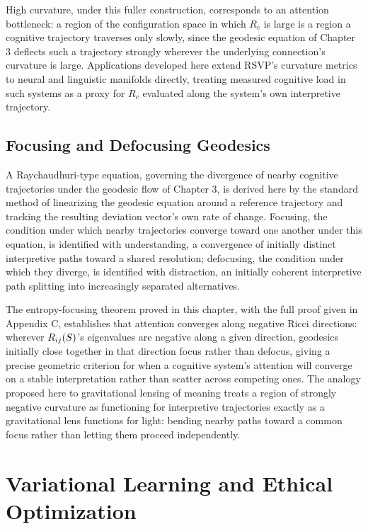 High curvature, under this fuller construction, corresponds to an attention bottleneck: a region of the configuration space in which $R_c$ is large is a region a cognitive trajectory traverses only slowly, since the geodesic equation of Chapter 3 deflects such a trajectory strongly wherever the underlying connection's curvature is large. Applications developed here extend RSVP's curvature metrics to neural and linguistic manifolds directly, treating measured cognitive load in such systems as a proxy for $R_c$ evaluated along the system's own interpretive trajectory.

\chapter{Focusing and Defocusing Geodesics}

A Raychaudhuri-type equation, governing the divergence of nearby cognitive trajectories under the geodesic flow of Chapter 3, is derived here by the standard method of linearizing the geodesic equation around a reference trajectory and tracking the resulting deviation vector's own rate of change. Focusing, the condition under which nearby trajectories converge toward one another under this equation, is identified with understanding, a convergence of initially distinct interpretive paths toward a shared resolution; defocusing, the condition under which they diverge, is identified with distraction, an initially coherent interpretive path splitting into increasingly separated alternatives.

The entropy-focusing theorem proved in this chapter, with the full proof given in Appendix C, establishes that attention converges along negative Ricci directions: wherever $R_{ij}(S)$'s eigenvalues are negative along a given direction, geodesics initially close together in that direction focus rather than defocus, giving a precise geometric criterion for when a cognitive system's attention will converge on a stable interpretation rather than scatter across competing ones. The analogy proposed here to gravitational lensing of meaning treats a region of strongly negative curvature as functioning for interpretive trajectories exactly as a gravitational lens functions for light: bending nearby paths toward a common focus rather than letting them proceed independently.

\part{Variational Learning and Ethical Optimization}

